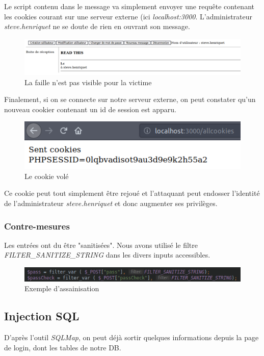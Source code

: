 \documentclass[12pt]{article}
\begin{document}
Le script contenu dans le message va simplement envoyer une requête contenant les cookies courant sur une serveur externe (ici \textit{localhost:3000}. L'administrateur \textit{steve.henriquet} ne se doute de rien en ouvrant son message.

\begin{figure}[H]
\centering
\includegraphics[width=\linewidth]{images/cookieStealing.png}
\caption{La faille n'est pas visible pour la victime}
\end{figure}

Finalement, si on se connecte sur notre serveur externe, on peut constater qu'un nouveau cookier contenant un id de session est apparu.

\begin{figure}[H]
\centering
\includegraphics[width=\linewidth]{images/cookieStolen.png}
\caption{Le cookie volé}
\end{figure}

Ce cookie peut tout simplement être rejoué et l'attaquant peut endosser l'identité de l'administrateur \textit{steve.henriquet} et donc augmenter ses privilèges.


\subsubsection{Contre-mesures}
Les entrées ont du être "sanitisées". Nous avons utilisé le filtre \textit{FILTER\_SANITIZE\_STRING} dans les divers inputs accessibles.
\begin{figure}[H]
\centering
\includegraphics[width=\linewidth]{images/sanitize.png}
\caption{Exemple d'assainisation}
\end{figure}

\subsection{Injection SQL}
D'après l'outil \textit{SQLMap}, on peut déjà sortir quelques informations depuis la page de login, dont les tables de notre DB. 
\end{document}
